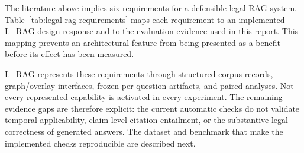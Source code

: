 The literature above implies six requirements for a defensible legal RAG
system. Table~\ref{tab:legal-rag-requirements} maps each requirement to an
implemented L\_RAG design response and to the evaluation evidence used in
this report. This mapping prevents an architectural feature from being
presented as a benefit before its effect has been measured.

L\_RAG represents these requirements through structured corpus records,
graph/overlay interfaces, frozen per-question artifacts, and paired analyses.
Not every represented capability is activated in every experiment. The
remaining evidence gaps are therefore explicit: the current automatic checks
do not validate temporal applicability, claim-level citation entailment, or
the substantive legal correctness of generated answers. The dataset and
benchmark that make the implemented checks reproducible are described next.
